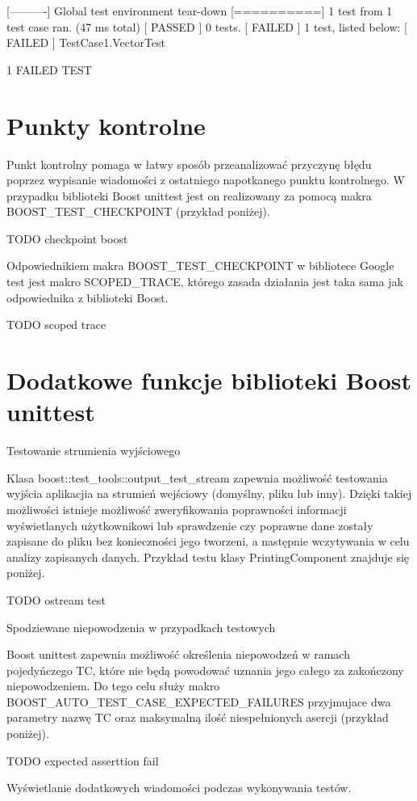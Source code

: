 \documentclass[12pt,a4paper,notitlepage]{report}
\begin{document}
[----------] Global test environment tear-down
[==========] 1 test from 1 test case ran. (47 ms total)
[  PASSED  ] 0 tests.
[  FAILED  ] 1 test, listed below:
[  FAILED  ] TestCase1.VectorTest

 1 FAILED TEST

\chapter{Punkty kontrolne}

Punkt kontrolny pomaga w łatwy sposób przeanalizować przyczynę błędu poprzez wypisanie wiadomości z ostatniego napotkanego punktu kontrolnego. W przypadku biblioteki Boost unittest jest on realizowany za pomocą makra BOOST_TEST_CHECKPOINT (przykład poniżej).

TODO checkpoint boost

Odpowiednikiem makra BOOST_TEST_CHECKPOINT w bibliotece Google test jest makro SCOPED_TRACE, którego zasada działania jest taka sama jak odpowiednika z biblioteki Boost.

TODO scoped trace

\chapter{Dodatkowe funkcje biblioteki Boost unittest}

Testowanie strumienia wyjściowego

Klasa boost::test_tools::output_test_stream zapewnia możliwość testowania wyjścia aplikacjia na strumień wejściowy (domyślny, pliku lub inny). Dzięki takiej możliwości istnieje możliwość zweryfikowania poprawności informacji wyświetlanych użytkownikowi lub sprawdzenie czy poprawne dane zostały zapisane do pliku bez konieczności jego tworzeni, a następnie wczytywania w celu analizy zapisanych danych.
Przykład testu klasy PrintingComponent znajduje się poniżej.

TODO ostream test

Spodziewane niepowodzenia w przypadkach testowych

Boost unittest zapewnia możliwość określenia niepowodzeń w ramach pojedyńczego TC, które nie będą powodować uznania jego całego za zakończony niepowodzeniem. Do tego celu służy makro BOOST_AUTO_TEST_CASE_EXPECTED_FAILURES przyjmujace dwa parametry nazwę TC oraz maksymalną ilość niespełnionych asercji (przykład poniżej).

TODO expected asserttion fail

Wyświetlanie dodatkowych wiadomości podczas wykonywania testów.
\end{document}
